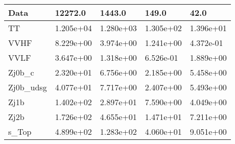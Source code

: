 \begin{table}
{\begin{tabularx}{\textwidth}{|X|X|X|X|X|}
\hline
Data & 12272.0 & 1443.0 & 149.0 & 42.0 \\
\hline
TT & 1.205e+04 & 1.280e+03 & 1.305e+02 & 1.396e+01 \\
VVHF & 8.229e+00 & 3.974e+00 & 1.241e+00 & 4.372e-01 \\
VVLF & 3.647e+00 & 1.318e+00 & 6.526e-01 & 1.889e+00 \\
Zj0b\_c & 2.320e+01 & 6.756e+00 & 2.185e+00 & 5.458e+00 \\
Zj0b\_udsg & 4.077e+01 & 7.717e+00 & 2.407e+00 & 5.493e+00 \\
Zj1b & 1.402e+02 & 2.897e+01 & 7.590e+00 & 4.049e+00 \\
Zj2b & 1.726e+02 & 4.655e+01 & 1.471e+01 & 7.211e+00 \\
s\_Top & 4.899e+02 & 1.283e+02 & 4.060e+01 & 9.051e+00 \\
\hline
\end{tabularx}
}
\label{tab:cr-Zee-2016}
\end{table}


